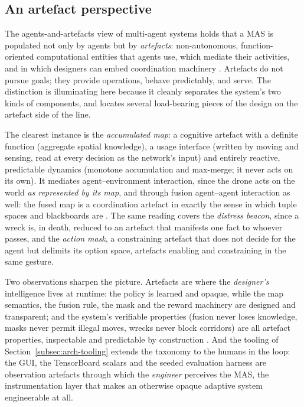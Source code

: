 \subsection{An artefact perspective}
\label{subsec:mas-artefacts}

The agents-and-artefacts view of multi-agent systems holds that a MAS is
populated not only by agents but by \emph{artefacts}: non-autonomous,
function-oriented computational entities that agents use, which mediate their
activities, and in which designers can embed coordination machinery
\citep{omicini2008artifacts}. Artefacts do not pursue goals; they provide
operations, behave predictably, and serve. The distinction is illuminating here
because it cleanly separates the system's two kinds of components, and locates
several load-bearing pieces of the design on the artefact side of the line.

The clearest instance is the \emph{accumulated map}: a cognitive artefact with a
definite function (aggregate spatial knowledge), a usage interface (written by
moving and sensing, read at every decision as the network's input) and entirely
reactive, predictable dynamics (monotone accumulation and max-merge; it never
acts on its own). It mediates agent--environment interaction, since the drone
acts on the world \emph{as represented by its map}, and through fusion
agent--agent interaction as well: the fused map is a coordination artefact in
exactly the sense in which tuple spaces and blackboards are
\citep{gelernter1985generative,omicini2008artifacts}. The same reading covers the
\emph{distress beacon}, since a wreck is, in death, reduced to an artefact that
manifests one fact to whoever passes, and the \emph{action mask}, a constraining
artefact that does not decide for the agent but delimits its option space,
artefacts enabling and constraining in the same gesture.

Two observations sharpen the picture. Artefacts are where the \emph{designer's}
intelligence lives at runtime: the policy is learned and opaque, while the map
semantics, the fusion rule, the mask and the reward machinery are designed and
transparent; and the system's verifiable properties (fusion never loses
knowledge, masks never permit illegal moves, wrecks never block corridors) are
all artefact properties, inspectable and predictable by construction
\citep{omicini2008artifacts}. And the tooling of
Section~\ref{subsec:arch-tooling} extends the taxonomy to the humans in the loop:
the GUI, the TensorBoard scalars and the seeded evaluation harness are
observation artefacts through which the \emph{engineer} perceives the MAS, the
instrumentation layer that makes an otherwise opaque adaptive system engineerable
at all.

